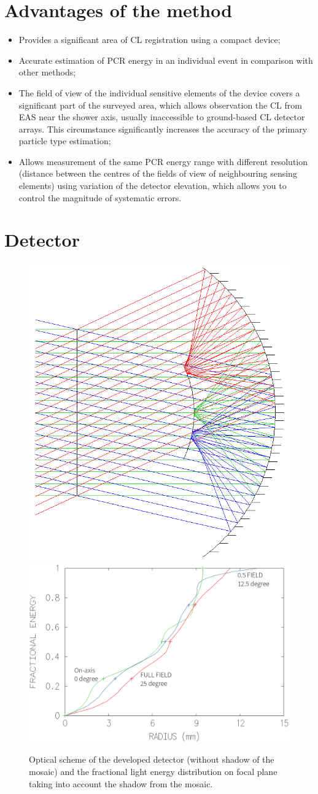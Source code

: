 \documentclass[a4paper,11pt]{article}
\begin{document}
\section{Advantages of the method}

\begin{itemize}
\item Provides a significant area of CL registration using a compact device;
\item Accurate estimation of PCR energy in an individual event in comparison with other methods;
\item The field of view of the individual sensitive elements of the device covers a significant part of the surveyed area, which allows observation the CL from EAS near the shower axis, usually inaccessible to ground-based CL detector arrays. This circumstance significantly increases the accuracy of the primary particle type estimation;
\item Allows measurement of the same PCR energy range with different resolution (distance between the centres of the fields of view of neighbouring sensing elements) using variation of the detector elevation, which allows you to control the magnitude of systematic errors.
\end{itemize}


\section{Detector}


\begin{figure}[htbp]
\centering %
\includegraphics[width=.32\textwidth,clip]{Sphere3optic.png}
\qquad
\includegraphics[width=.48\textwidth,origin=c,angle=0]{Sphere3spot_energy.png}
\caption{\label{fig:sphere3} Optical scheme of the developed detector (without shadow of the mosaic) and the fractional light energy distribution on focal plane taking into account the shadow from the mosaic.}
\end{figure}
\end{document}
